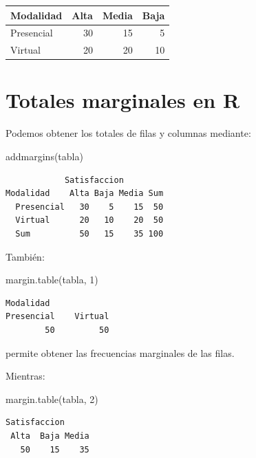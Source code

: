 \documentclass[
  spanish,
  14pt,
  letterpaper,
  DIV=11,
  numbers=noendperiod]{scrartcl}
\newenvironment{Shaded}{\begin{snugshade}}{\end{snugshade}}
\newcommand{\DecValTok}[1]{\textcolor[rgb]{0.68,0.51,1.00}{#1}}
\newcommand{\FunctionTok}[1]{\textcolor[rgb]{0.65,0.89,0.18}{#1}}
\newcommand{\NormalTok}[1]{\textcolor[rgb]{0.97,0.97,0.95}{#1}}
\newcounter{none} %
\begin{document}
{\def\LTcaptype{none} %
\begin{longtable}[]{@{}lrrr@{}}
\toprule\noalign{}
Modalidad & Alta & Media & Baja \\
\midrule\noalign{}
\endhead
\bottomrule\noalign{}
\endlastfoot
Presencial & 30 & 15 & 5 \\
Virtual & 20 & 20 & 10 \\
\end{longtable}
}

\section{Totales marginales en R}\label{totales-marginales-en-r}

Podemos obtener los totales de filas y columnas mediante:

\begin{Shaded}
\begin{Highlighting}[]
\FunctionTok{addmargins}\NormalTok{(tabla)}
\end{Highlighting}
\end{Shaded}

\begin{verbatim}
            Satisfaccion
Modalidad    Alta Baja Media Sum
  Presencial   30    5    15  50
  Virtual      20   10    20  50
  Sum          50   15    35 100
\end{verbatim}

También:

\begin{Shaded}
\begin{Highlighting}[]
\FunctionTok{margin.table}\NormalTok{(tabla, }\DecValTok{1}\NormalTok{)}
\end{Highlighting}
\end{Shaded}

\begin{verbatim}
Modalidad
Presencial    Virtual 
        50         50 
\end{verbatim}

permite obtener las frecuencias marginales de las filas.

Mientras:

\begin{Shaded}
\begin{Highlighting}[]
\FunctionTok{margin.table}\NormalTok{(tabla, }\DecValTok{2}\NormalTok{)}
\end{Highlighting}
\end{Shaded}

\begin{verbatim}
Satisfaccion
 Alta  Baja Media 
   50    15    35 
\end{verbatim}
\end{document}
